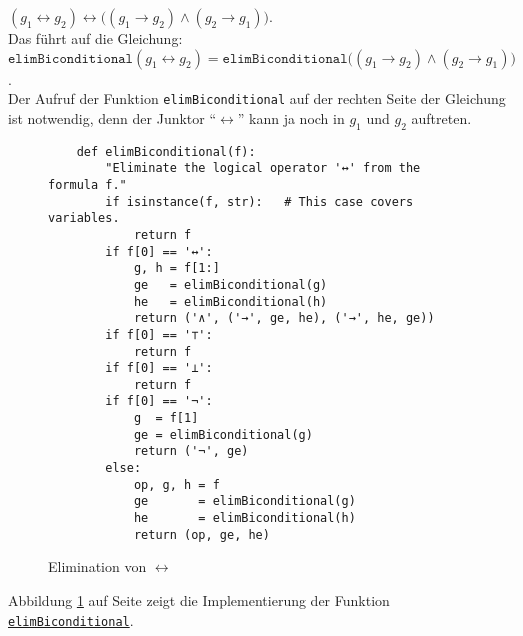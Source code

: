 \begin{enumerate}
      $(g_1 \leftrightarrow g_2) \leftrightarrow \bigl( (g_1 \rightarrow g_2) \wedge (g_2 \rightarrow g_1)\bigr)$.
      \\[0.2cm]
      Das führt auf die Gleichung:
      \\[0.2cm]
      \hspace*{1.3cm} 
      $\texttt{elimBiconditional}(g_1 \leftrightarrow g_2) = \texttt{elimBiconditional}\bigl( (g_1 \rightarrow g_2) \wedge (g_2 \rightarrow g_1)\bigr)$. 
      \\[0.2cm]
      Der Aufruf der Funktion \texttt{elimBiconditional} auf der rechten Seite der Gleichung ist notwendig,
      denn der Junktor ``$\leftrightarrow$'' kann ja noch in $g_1$ und $g_2$ auftreten.
\end{enumerate}


\begin{figure}[!ht]
  \centering
\begin{verbatim}
    def elimBiconditional(f):
        "Eliminate the logical operator '↔' from the formula f."
        if isinstance(f, str):   # This case covers variables.
            return f
        if f[0] == '↔':
            g, h = f[1:]
            ge   = elimBiconditional(g)
            he   = elimBiconditional(h)
            return ('∧', ('→', ge, he), ('→', he, ge))
        if f[0] == '⊤':
            return f
        if f[0] == '⊥':
            return f
        if f[0] == '¬':
            g  = f[1]
            ge = elimBiconditional(g)
            return ('¬', ge)
        else:
            op, g, h = f
            ge       = elimBiconditional(g)
            he       = elimBiconditional(h)
            return (op, ge, he)
\end{verbatim}
\vspace*{-0.3cm}
  \caption{Elimination von $\leftrightarrow$}
  \label{fig:elimBiconditional}
\end{figure} 
Abbildung
\ref{fig:elimBiconditional} auf Seite \pageref{fig:elimBiconditional} zeigt die Implementierung der
Funktion 
\href{https://github.com/karlstroetmann/Logic/blob/master/Python/CNF.ipynb}{\texttt{elimBiconditional}}.

